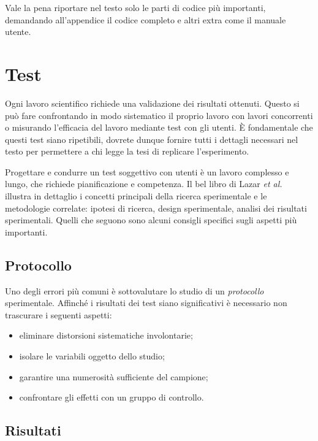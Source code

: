 \documentclass[12pt]{report}
\begin{document}
Vale la pena riportare nel testo solo le parti di codice più importanti, demandando all'appendice il codice completo e altri extra come il manuale utente.

% 
% 

\chapter{Test}
\label{chap:test}

Ogni lavoro scientifico richiede una validazione dei risultati ottenuti. Questo si può fare confrontando in modo sistematico il proprio lavoro con lavori concorrenti o misurando l'efficacia del lavoro mediante test con gli utenti. \`E fondamentale che questi test siano ripetibili, dovrete dunque fornire tutti i dettagli necessari nel testo per permettere a chi legge la tesi di replicare l'esperimento.

Progettare e condurre un test soggettivo con utenti \`e un lavoro complesso e lungo, che richiede pianificazione e competenza. Il bel libro di Lazar {\em et al.}~\cite{lazar2017methods} illustra in dettaglio i concetti principali della ricerca sperimentale e le metodologie correlate: ipotesi di ricerca, design sperimentale, analisi dei risultati sperimentali. Quelli che seguono sono alcuni consigli specifici sugli aspetti pi\`u importanti.

\section{Protocollo}

Uno degli errori più comuni è sottovalutare lo studio di un \textit{protocollo} sperimentale. Affinché i risultati dei test siano significativi è necessario non trascurare i seguenti aspetti:

\begin{itemize}
	\item eliminare distorsioni sistematiche involontarie;
	\item isolare le variabili oggetto dello studio;
	\item garantire una numerosità sufficiente del campione;
	\item confrontare gli effetti con un gruppo di controllo.
\end{itemize}

\section{Risultati}
\end{document}
